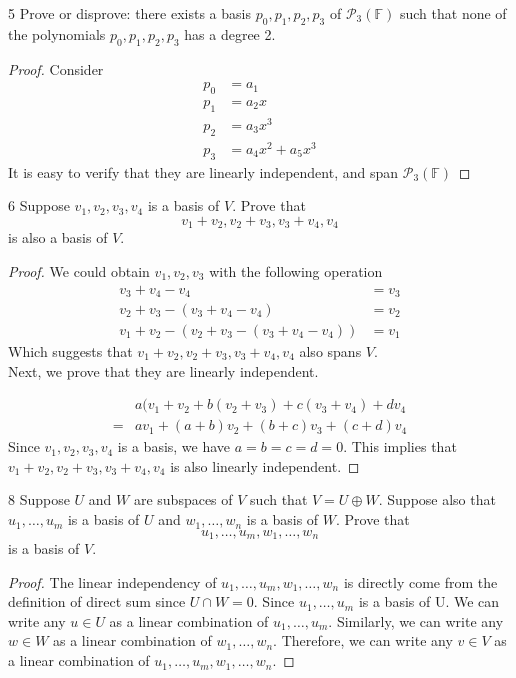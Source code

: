 \documentclass{extarticle}
\newenvironment{problem}[1]{\begin{prob*}{#1}{}}{\end{prob*}}
\newcommand{\F}{\mathbb{F}}
\begin{document}
\begin{problem}{5}
  Prove or disprove: there exists a basis \(p_0, p_1, p_2, p_3\) of \(\mathcal{P}_3 (\F)\)
  such that none of the polynomials \(p_0, p_1, p_2, p_3\) has a degree 2.
\end{problem}
\begin{proof}
  Consider
  \begin{align*}
    p_0 &= a_1 \\
    p_1 &= a_2 x \\
    p_2 &= a_3 x^3 \\
    p_3 &= a_4 x^2 + a_5 x^3
  \end{align*}
  It is easy to verify that they are linearly independent, and span $\mathcal{P}_3(\F)$
\end{proof}

\begin{problem}{6}
  Suppose \(v_{1}, v_{2}, v_{3}, v_{4}\) is a basis of $V$. Prove that \[
    v_{1} + v_{2}, v_{2} + v_{3}, v_{3} + v_{4}, v_{4}\]
  is also a basis of $V$.
\end{problem}
\begin{proof}
We could obtain \(v_{1}, v_{2}, v_{3}\) with the following operation
\begin{align}
v_{3} + v_{4} - v_{4} &= v_{3} \\
v_{2} + v_{3} - (v_{3} + v_{4} - v_{4}) &= v_{2} \\
v_{1} + v_{2} - (v_{2} + v_{3} - (v_{3} + v_{4} - v_{4})) &= v_{1}
\end{align}
Which suggests that \(v_{1} + v_{2}, v_{2} + v_{3}, v_{3} + v_{4}, v_{4}\)
also spans $V$. \\
Next, we prove that they are linearly independent.

\begin{align}
& a(v_{1} + v_{2} + b ( v_{2} + v_{3} ) + c (v_{3} + v_{4}) + d v_{4} \\
= & a v_{1} + (a + b) v_{2} + (b + c) v_{3} + (c + d) v_{4}
\end{align}
Since \(v_{1}, v_{2}, v_{3}, v_{4}\) is a basis, we have \(a = b = c = d = 0\).
This implies that \(v_{1} + v_{2}, v_{2} + v_{3}, v_{3} + v_{4}, v_{4}\)
is also linearly independent.
\end{proof}

\begin{problem}{8}
  Suppose $U$ and $W$ are subspaces of $V$ such that \(V = U \oplus W\).
  Suppose also that \(u_{1},\dots,u_{m}\) is a basis of $U$ and \(w_{1},\dots,w_{n}\)
  is a basis of $W$. Prove that \[u_{1},\dots,u_{m}, w_{1},\dots,w_{n}\]
  is a basis of $V$.
\end{problem}
\begin{proof}
  The linear independency of \(u_{1},\dots,u_{m}, w_{1},\dots,w_{n}\) is directly come from the definition of direct sum since \(U \cap W = {0}\).
  Since \(u_{1}, \dots, u_{m}\) is a basis of U. We can write any \(u \in U\) as a linear combination of \(u_{1}, \dots, u_{m}\). Similarly, we can write any \(w \in W\) as a linear combination of \(w_{1}, \dots, w_{n}\).
  Therefore, we can write any \(v \in V\) as a linear combination of \(u_{1}, \dots, u_{m}, w_{1}, \dots, w_{n}\).
\end{proof}
\end{document}
